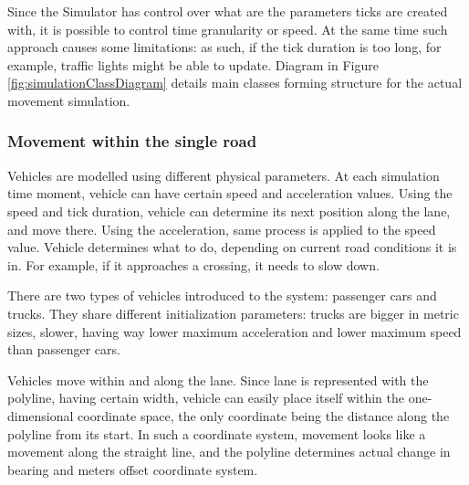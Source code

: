 Since the Simulator has control over what are the parameters ticks are created with, it is possible to control time granularity or speed. At the same time such approach causes some limitations: as such, if the tick duration is too long, for example, traffic lights might be able to update.
Diagram in Figure \ref{fig:simulationClassDiagram} details main classes forming structure for the actual movement simulation.

\subsubsection{Movement within the single road}
Vehicles are modelled using different physical parameters. At each simulation time moment, vehicle can have certain speed and acceleration values. Using the speed and tick duration, vehicle can determine its next position along the lane, and move there. Using the acceleration, same process is applied to the speed value. Vehicle determines what to do, depending on current road conditions it is in. For example, if it approaches a crossing, it needs to slow down.

There are two types of vehicles introduced to the system: passenger cars and trucks. They share different initialization parameters: trucks are bigger in metric sizes, slower, having way lower maximum acceleration and lower maximum speed than passenger cars.

Vehicles move within and along the lane. Since lane is represented with the polyline, having certain width, vehicle can easily place itself within the one-dimensional coordinate space, the only coordinate being the distance along the polyline from its start. In such a coordinate system, movement looks like a movement along the straight line, and the polyline determines actual change in bearing and meters offset coordinate system.

